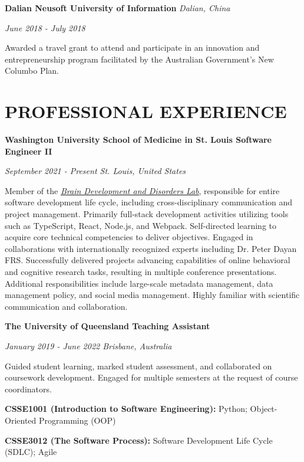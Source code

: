\documentclass{article}
\begin{document}
  \medbreak

  \textbf{Dalian Neusoft University of Information} \hfill \textit{Dalian, China}

  \textit{June 2018 - July 2018}

  Awarded a travel grant to attend and participate in an innovation and entrepreneurship program facilitated by the Australian Government's New Columbo Plan.

  \section*{\centering\uppercase{Professional Experience}}

  {\large\textbf{Washington University School of Medicine in St. Louis \hfill Software Engineer II}}

  \textit{September 2021 - Present \hfill St. Louis, United States}

  Member of the \href{https://sites.wustl.edu/richardslab/}{\color{blue}\underline{\textit{Brain Development and Disorders Lab}}}, responsible for entire software development life cycle, including cross-disciplinary communication and project management.
  Primarily full-stack development activities utilizing tools such as TypeScript, React, Node.js, and Webpack.
  Self-directed learning to acquire core technical competencies to deliver objectives.
  Engaged in collaborations with internationally recognized experts including Dr. Peter Dayan {\small{FRS}}.
  Successfully delivered projects advancing capabilities of online behavioral and cognitive research tasks, resulting in multiple conference presentations.
  Additional responsibilities include large-scale metadata management, data management policy, and social media management.
  Highly familiar with scientific communication and collaboration.

  \medbreak

  {\large\textbf{The University of Queensland \hfill Teaching Assistant}}

  \textit{January 2019 - June 2022 \hfill Brisbane, Australia}

  Guided student learning, marked student assessment, and collaborated on coursework development. Engaged for multiple semesters at the request of course coordinators.

  \textbf{CSSE1001 (Introduction to Software Engineering):} Python; Object-Oriented Programming (OOP)

  \textbf{CSSE3012 (The Software Process):} Software Development Life Cycle (SDLC); Agile
\end{document}
